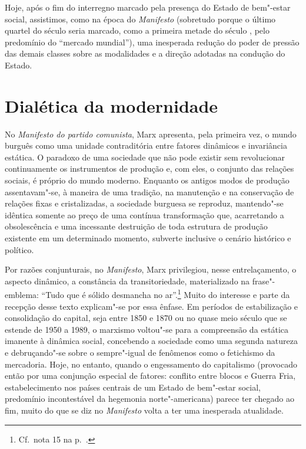 Hoje, após o fim do interregno marcado pela presença do Estado de
bem"-estar social, assistimos, como na época do \textit{Manifesto
}(sobretudo porque o último quartel do século  seria marcado, como a
primeira metade do século , pelo predomínio do “mercado mundial”),
uma inesperada redução do poder de pressão das demais classes sobre as
modalidades e a direção adotadas na condução do Estado.

\section*{Dialética da modernidade}

No \textit{Manifesto do partido comunista}, Marx apresenta,
pela primeira vez, o mundo burguês como uma unidade contraditória entre
fatores dinâmicos e invariância estática. O paradoxo de uma sociedade
que não pode existir sem revolucionar continuamente os instrumentos de
produção e, com eles, o conjunto das relações sociais, é próprio do
mundo moderno. Enquanto os antigos modos de produção assentavam"-se, à
maneira de uma tradição, na manutenção e na conservação de relações fixas
e cristalizadas, a sociedade burguesa se reproduz, mantendo"-se
idêntica somente ao preço de uma contínua transformação que,
acarretando a obsolescência e uma incessante destruição de toda
estrutura de produção existente em um determinado momento, subverte
inclusive o cenário histórico e político.

Por razões conjunturais, no \textit{Manifesto}, Marx privilegiou, nesse entrelaçamento, o aspecto dinâmico, a constância
da transitoriedade, materializado na frase"-emblema: “Tudo que é
sólido desmancha no ar”.\footnote{ Cf.~nota 15 na p.~\pageref{2}.} Muito do interesse e parte da recepção desse
texto explicam"-se por essa ênfase. Em períodos de estabilização e
consolidação do capital, seja entre 1850 e 1870 ou no quase meio século
que se estende de 1950 a 1989, o marxismo voltou"-se para a
compreensão da estática imanente à dinâmica social, concebendo a
sociedade como uma segunda natureza e debruçando"-se sobre o
sempre"-igual de fenômenos como o fetichismo da mercadoria. Hoje, no
entanto, quando o engessamento do capitalismo (provocado então por uma
conjunção especial de fatores: conflito entre blocos e Guerra Fria,
estabelecimento nos países centrais de um Estado de bem"-estar social,
predomínio incontestável da hegemonia norte"-americana) parece ter
chegado ao fim, muito do que se diz no \textit{Manifesto} volta a ter
uma inesperada atualidade.

